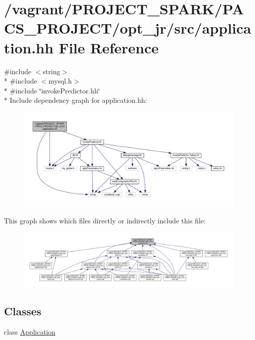 \hypertarget{application_8hh}{\section{/vagrant/\-P\-R\-O\-J\-E\-C\-T\-\_\-\-S\-P\-A\-R\-K/\-P\-A\-C\-S\-\_\-\-P\-R\-O\-J\-E\-C\-T/opt\-\_\-jr/src/application.hh File Reference}
\label{application_8hh}
}
{\ttfamily \#include $<$string$>$}\\*
{\ttfamily \#include $<$mysql.\-h$>$}\\*
{\ttfamily \#include \char`\"{}invoke\-Predictor.\-hh\char`\"{}}\\*
Include dependency graph for application.\-hh\-:\nopagebreak
\begin{figure}[H]
\begin{center}
\leavevmode
\includegraphics[width=350pt]{application_8hh__incl}
\end{center}
\end{figure}
This graph shows which files directly or indirectly include this file\-:\nopagebreak
\begin{figure}[H]
\begin{center}
\leavevmode
\includegraphics[width=350pt]{application_8hh__dep__incl}
\end{center}
\end{figure}
\subsection*{Classes}
\begin{DoxyCompactItemize}
\item 
class \hyperlink{classApplication}{Application}
\end{DoxyCompactItemize}

